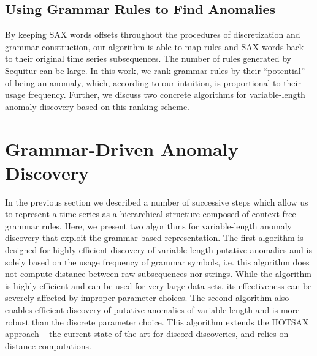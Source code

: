 \documentclass{llncs}
\begin{document}
\subsection{Using Grammar Rules to Find Anomalies}
By keeping SAX words offsets throughout the procedures of discretization and grammar construction, our algorithm is able to map rules and SAX words back to their original time series subsequences. The number of rules generated by Sequitur can be large. In this work, we rank grammar rules by their ``potential'' of being an anomaly, which, according to our intuition, is proportional to their usage frequency. Further, we discuss two concrete algorithms for variable-length anomaly discovery based on this ranking scheme.

\section{Grammar-Driven Anomaly Discovery}
In the previous section we described a number of successive steps which allow us to represent a time series as a hierarchical structure composed of context-free grammar rules. Here, we present two algorithms for variable-length anomaly discovery that exploit the grammar-based representation. 
The first algorithm is designed for highly efficient discovery of variable length putative anomalies and is solely based on the usage frequency of grammar symbols, i.e. this algorithm does not compute distance between raw subsequences nor strings. While the algorithm is highly efficient and can be used for very large data sets, its effectiveness can be severely affected by improper parameter choices.
The second algorithm also enables efficient discovery of putative anomalies of variable length and is more robust than the discrete parameter choice. This algorithm extends the HOTSAX approach -- the current state of the art for discord discoveries, and relies on  distance computations.
\end{document}
